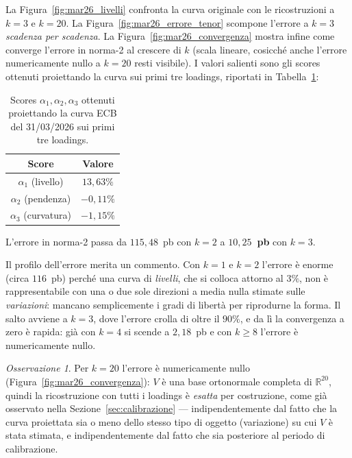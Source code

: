\documentclass[11pt,a4paper]{article}
\theoremstyle{plain}
\theoremstyle{definition}
\theoremstyle{remark}
\newtheorem*{osservazione}{Osservazione}
\begin{document}
La Figura~\ref{fig:mar26_livelli} confronta la curva originale con le
ricostruzioni a $k=3$ e $k=20$. La Figura~\ref{fig:mar26_errore_tenor}
scompone l'errore a $k=3$ \emph{scadenza per scadenza}. La
Figura~\ref{fig:mar26_convergenza} mostra infine come converge l'errore in
norma-2 al crescere di $k$ (scala lineare, cosicché anche l'errore
numericamente nullo a $k=20$ resti visibile). I valori salienti sono gli
scores ottenuti proiettando la curva sui primi tre loadings, riportati in
Tabella~\ref{tab:alpha_mar26}:

\begin{table}[H]
\centering
\begin{tabular}{c c}
\toprule
Score & Valore \\
\midrule
$\alpha_1$ (livello)   & $13{,}63\%$ \\
$\alpha_2$ (pendenza)  & $-0{,}11\%$ \\
$\alpha_3$ (curvatura) & $-1{,}15\%$ \\
\bottomrule
\end{tabular}
\caption{Scores $\alpha_1,\alpha_2,\alpha_3$ ottenuti proiettando la curva
ECB del 31/03/2026 sui primi tre loadings.}
\label{tab:alpha_mar26}
\end{table}

\noindent L'errore in norma-2 passa da $115{,}48$~pb con $k=2$ a
\textbf{$10{,}25$~pb} con $k=3$.

Il profilo dell'errore merita un commento. Con $k=1$ e $k=2$ l'errore è
enorme (circa $116$~pb) perché una curva di \emph{livelli}, che si colloca
attorno al $3\%$, non è rappresentabile con una o due sole direzioni a media
nulla stimate sulle \emph{variazioni}: mancano semplicemente i gradi di
libertà per riprodurne la forma. Il salto avviene a $k=3$, dove l'errore
crolla di oltre il $90\%$, e da lì la convergenza a zero è rapida: già con
$k=4$ si scende a $2{,}18$~pb e con $k \geq 8$ l'errore è numericamente
nullo.

\begin{osservazione}
Per $k=20$ l'errore è numericamente nullo
(Figura~\ref{fig:mar26_convergenza}): $V$ è una base ortonormale completa di
$\mathbb{R}^{20}$, quindi la ricostruzione con tutti i loadings è
\emph{esatta} per costruzione, come già osservato nella
Sezione~\ref{sec:calibrazione} --- indipendentemente dal fatto che la curva
proiettata sia o meno dello stesso tipo di oggetto (variazione) su cui $V$ è
stata stimata, e indipendentemente dal fatto che sia posteriore al periodo di
calibrazione.
\end{osservazione}
\end{document}
